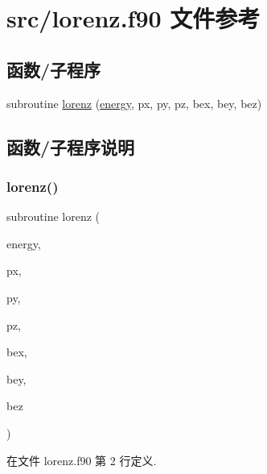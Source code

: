 \hypertarget{lorenz_8f90}{}\section{src/lorenz.f90 文件参考}
\label{lorenz_8f90}
\subsection*{函数/子程序}
\begin{DoxyCompactItemize}
\item 
subroutine \mbox{\hyperlink{lorenz_8f90_ad62cc758636257e868aab2973c7e6318}{lorenz}} (\mbox{\hyperlink{energy_8f90_aa09f690b751989fd1445ea720333253a}{energy}}, px, py, pz, bex, bey, bez)
\end{DoxyCompactItemize}


\subsection{函数/子程序说明}
\mbox{\label{lorenz_8f90_ad62cc758636257e868aab2973c7e6318}} 
\subsubsection{\texorpdfstring{lorenz()}{lorenz()}}
{\footnotesize\ttfamily subroutine lorenz (\begin{DoxyParamCaption}\item[{}]{energy,  }\item[{}]{px,  }\item[{}]{py,  }\item[{}]{pz,  }\item[{}]{bex,  }\item[{}]{bey,  }\item[{}]{bez }\end{DoxyParamCaption})}



在文件 lorenz.\+f90 第 2 行定义.

